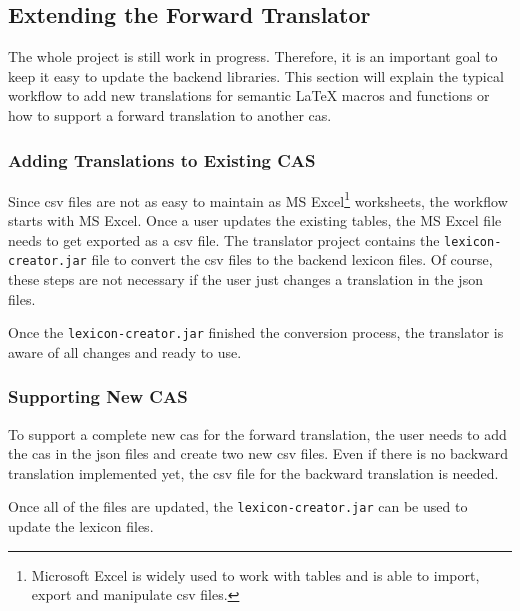 \subsection{Extending the Forward Translator}\label{subsec:extension}
The whole project is still work in progress. Therefore, it is an important goal to keep it easy to update the backend libraries. This section will explain the typical workflow to add new translations for semantic \LaTeX{} macros and \Maple{} functions or how to support a forward translation to another \gls{cas}.

\subsubsection{Adding Translations to Existing CAS}
Since \gls{csv} files are not as easy to maintain as MS Excel\footnote{Microsoft Excel is widely used to work with tables and is able to import, export and manipulate \gls{csv} files.} worksheets, the workflow starts with MS Excel. Once a user updates the existing tables, the MS Excel file needs to get exported as a \gls{csv} file. The translator project contains the \verb|lexicon-creator.jar| file to convert the \gls{csv} files to the backend lexicon files. Of course, these steps are not necessary if the user just changes a translation in the \gls{json} files.

Once the \verb|lexicon-creator.jar| finished the conversion process, the translator is aware of all changes and ready to use.

\subsubsection{Supporting New CAS}
To support a complete new \gls{cas} for the forward translation, the user needs to add the \gls{cas} in the \gls{json} files and create two new \gls{csv} files. Even if there is no backward translation implemented yet, the \gls{csv} file for the backward translation is needed. 

Once all of the files are updated, the \verb|lexicon-creator.jar| can be used to update the lexicon files.